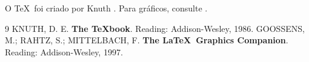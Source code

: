 \documentclass[a4paper]{article}
\begin{document}
O \TeX\ foi criado por Knuth \cite{knuth1986}. Para gráficos, consulte
\cite{goossens1997}.

\begin{thebibliography}{9}   %
   KNUTH, D. E. \textbf{The \TeX book}.
    Reading: Addison-Wesley, 1986.
   GOOSSENS, M.; RAHTZ, S.; MITTELBACH, F.
    \textbf{The \LaTeX\ Graphics Companion}. Reading: Addison-Wesley, 1997.
\end{thebibliography}
\end{document}
